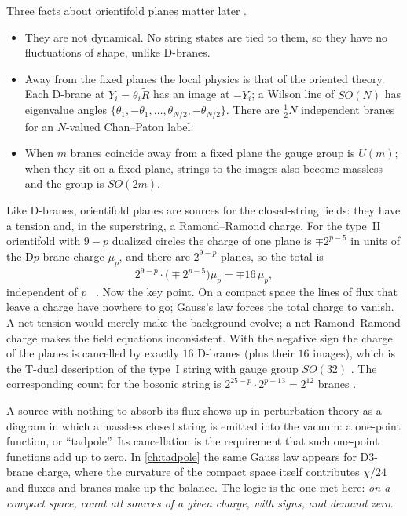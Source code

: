 Three facts about orientifold planes matter later .
\begin{itemize}[leftmargin=*]
\item They are not dynamical. No string states are tied to them, so they have no fluctuations
 of shape, unlike D-branes.
\item Away from the fixed planes the local physics is that of the oriented theory. Each D-brane
 at $Y_i=\theta_i\tilde R$ has an image at $-Y_i$; a Wilson line of $SO(N)$ has eigenvalue angles
 $\{\theta_1,-\theta_1,\dots,\theta_{N/2},-\theta_{N/2}\}$. There are $\frac12N$ independent branes
 for an $N$-valued Chan--Paton label.
\item When $m$ branes coincide away from a fixed plane the gauge group is $U(m)$; when they sit
 on a fixed plane, strings to the images also become massless and the group is $SO(2m)$.
\end{itemize}
Like D-branes, orientifold planes are sources for the closed-string fields: they have a tension
and, in the superstring, a Ramond--Ramond charge. For the type~II orientifold with $9-p$
dualized circles the charge of one plane is $\mp2^{p-5}$ in units of the D$p$-brane charge
$\mu_p$, and there are $2^{9-p}$ planes, so the total is
\begin{equation}\label{eq:dbranes:sixteen}
 2^{9-p}\cdot\big(\mp2^{p-5}\big)\mu_p=\mp16\,\mu_p ,
\end{equation}
independent of $p$ \TL\ . Now the key point. On a
compact space the lines of flux that leave a charge have nowhere to go; Gauss's law forces the
total charge to vanish. A net tension would merely make the background evolve; a net
Ramond--Ramond charge makes the field equations inconsistent. With the negative sign the charge
of the planes is cancelled by exactly $16$ D-branes (plus their $16$ images), which is the T-dual
description of the type~I string with gauge group $SO(32)$ . The
corresponding count for the bosonic string is $2^{25-p}\cdot2^{p-13}=2^{12}$ branes
.

\begin{physicsbox}
A source with nothing to absorb its flux shows up in perturbation theory as a diagram in which a
massless closed string is emitted into the vacuum: a one-point function, or ``tadpole''. Its
cancellation is the requirement that such one-point functions add up to zero. In
\cref{ch:tadpole} the same Gauss law appears for D$3$-brane charge, where the curvature of the
compact space itself contributes $\chi/24$ and fluxes and branes make up the balance. The logic
is the one met here: \emph{on a compact space, count all sources of a given charge, with signs,
and demand zero}.
\end{physicsbox}

